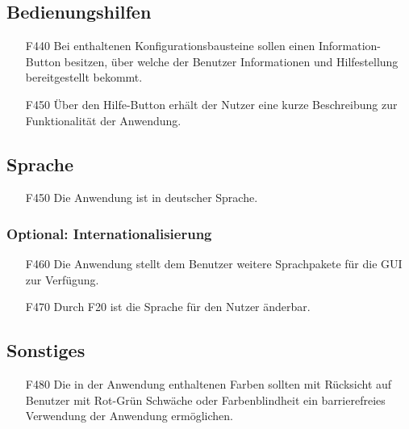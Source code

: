 \documentclass[parskip=full]{scrartcl}
\begin{document}
\subsection{Bedienungshilfen}

\begin{itemize}

\item[F440] Bei enthaltenen Konfigurationsbausteine sollen einen Information-Button besitzen, über welche der Benutzer Informationen und Hilfestellung bereitgestellt bekommt.
\item[F450] Über den Hilfe-Button erhält der Nutzer eine kurze Beschreibung zur Funktionalität der Anwendung.

\end{itemize}

\subsection{Sprache}

\begin{itemize}

\item[F450] Die Anwendung ist in deutscher Sprache.

\end{itemize}

\subsubsection{Optional: Internationalisierung}

\begin{itemize}

\item[F460] Die Anwendung stellt dem Benutzer weitere Sprachpakete für die GUI zur Verfügung.
\item[F470] Durch F20 ist die Sprache für den Nutzer änderbar.

\end{itemize}

\subsection{Sonstiges}

\begin{itemize}

\item[F480] Die in der Anwendung enthaltenen Farben sollten mit Rücksicht auf Benutzer mit Rot-Grün Schwäche oder Farbenblindheit ein barrierefreies Verwendung der Anwendung ermöglichen.

\end{itemize}
\end{document}
